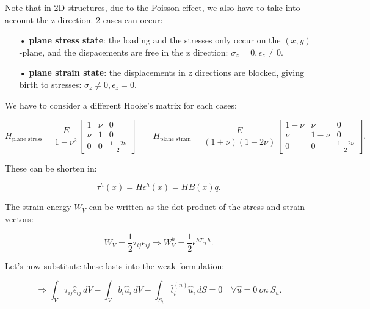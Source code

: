	Note that in 2D structures, due to the Poisson effect, we also have to take into account the z direction. 2 cases can occur: 
	
	\begin{itemize}
	\item[•] \textbf{plane stress state}: the loading and the stresses only occur on the $(x,y)$-plane, and the dispacements are free in the z direction: $\sigma _z = 0, \epsilon _z \neq 0$. 
	
	\item[•] \textbf{plane strain state}: the displacements in z directions are blocked, giving birth to stresses: $\sigma _z\neq 0, \epsilon _z = 0$. 
	\end{itemize}
	
	We have to consider a different Hooke's matrix for each cases: 
	
	\begin{equation}
	H_{\mbox{plane stress}} = \frac{E}{1-\nu ^2}\left[
	\begin{array}{ccc}
	1&\nu &0\\
	\nu&1 &0\\
	0& 0&\frac{1-2\nu}{2}
	\end{array}
	\right]
	\qquad
	H_{\mbox{plane strain}} = \frac{E}{(1+\nu)(1-2\nu)} \left[
	\begin{array}{ccc}
	1-\nu &\nu &0\\
	\nu&1-\nu &0\\
	0& 0&\frac{1-2\nu}{2}
	\end{array}
	\right].
	\end{equation}
	
	These can be shorten in: 
	
	\begin{equation}
	\tau ^h (x) = H\epsilon ^h (x) = HB(x) q.
	\end{equation}
	
	The strain energy $W_V$ can be written as the dot product of the stress and strain vectors:
	
	\begin{equation}
	W_V = \frac{1}{2} \tau _{ij} \epsilon _{ij} \Rightarrow W_V^h = \frac{1}{2} \epsilon ^{hT} \tau ^h.  
	\end{equation}
	
	Let's now substitute these lasts into the weak formulation:
	
	\begin{equation}
	\Rightarrow \int _V \tau _{ij} \hat{\epsilon}_{ij} \, dV - \int _V b_i \hat{u}_i \, dV - \int _{S_t} \bar{t}_i^{(n)} \hat{u}_i\, dS = 0 \quad \forall \hat{u} = 0 \ on \ S_u. 
	\end{equation}
	
